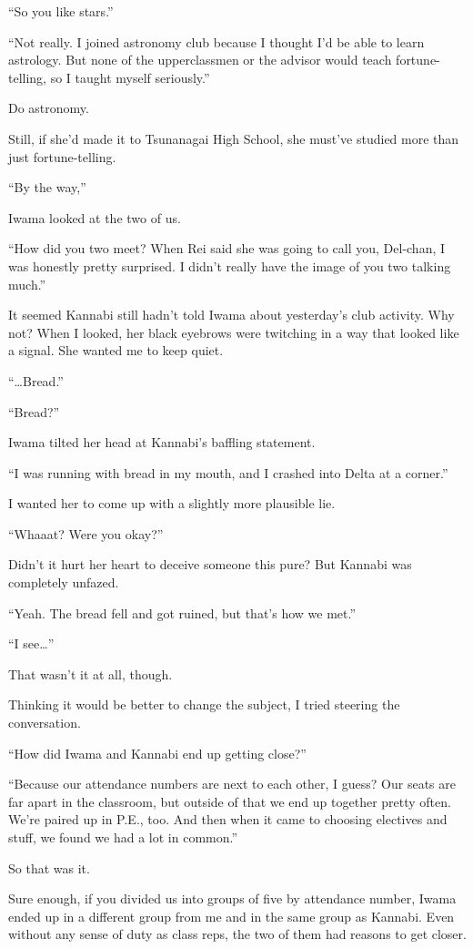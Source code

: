 \documentclass[
    a4paper,
    12pt,
    twoside,
    openany,
    UTF8,
    fontset=windows
]{ctexbook}
\begin{document}
``So you like stars.''

``Not really. I joined astronomy club because I thought I'd be able to learn astrology. But none of the upperclassmen or the advisor would teach fortune-telling, so I taught myself seriously.''

Do astronomy.

Still, if she'd made it to Tsunanagai High School, she must've studied more than just fortune-telling.

``By the way,''

Iwama looked at the two of us.

``How did you two meet? When Rei said she was going to call you, Del-chan, I was honestly pretty surprised. I didn't really have the image of you two talking much.''

It seemed Kannabi still hadn't told Iwama about yesterday's club activity. Why not? When I looked, her black eyebrows were twitching in a way that looked like a signal. She wanted me to keep quiet.

``\dots Bread.''

``Bread?''

Iwama tilted her head at Kannabi's baffling statement.

``I was running with bread in my mouth, and I crashed into Delta at a corner.''

I wanted her to come up with a slightly more plausible lie.

``Whaaat? Were you okay?''

Didn't it hurt her heart to deceive someone this pure? But Kannabi was completely unfazed.

``Yeah. The bread fell and got ruined, but that's how we met.''

``I see\dots''

That wasn't it at all, though.

Thinking it would be better to change the subject, I tried steering the conversation.

``How did Iwama and Kannabi end up getting close?''

``Because our attendance numbers are next to each other, I guess? Our seats are far apart in the classroom, but outside of that we end up together pretty often. We're paired up in P.E., too. And then when it came to choosing electives and stuff, we found we had a lot in common.''

So that was it.

Sure enough, if you divided us into groups of five by attendance number, Iwama ended up in a different group from me and in the same group as Kannabi. Even without any sense of duty as class reps, the two of them had reasons to get closer.
\end{document}
